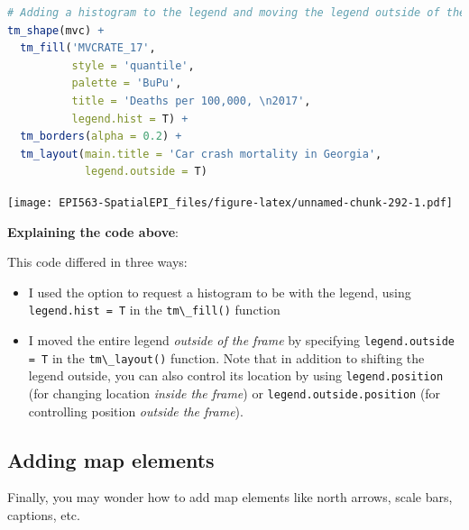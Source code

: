 \documentclass[
]{book}
\newcommand{\passthrough}[1]{#1}
\providecommand{\tightlist}{%
  \setlength{\itemsep}{0pt}\setlength{\parskip}{0pt}}
\begin{document}
\begin{lstlisting}[language=R]
# Adding a histogram to the legend and moving the legend outside of the frame
tm_shape(mvc) +
  tm_fill('MVCRATE_17',
          style = 'quantile',
          palette = 'BuPu',
          title = 'Deaths per 100,000, \n2017',
          legend.hist = T) +
  tm_borders(alpha = 0.2) +
  tm_layout(main.title = 'Car crash mortality in Georgia',
            legend.outside = T)
\end{lstlisting}

\texttt{[image: EPI563-SpatialEPI\_files/figure-latex/unnamed-chunk-292-1.pdf]}

\textbf{Explaining the code above}:

This code differed in three ways:

\begin{itemize}
\tightlist
\item
  I used the option to request a histogram to be with the legend, using \passthrough{\lstinline!legend.hist = T!} in the \passthrough{\lstinline!tm\_fill()!} function
\item
  I moved the entire legend \emph{outside of the frame} by specifying \passthrough{\lstinline!legend.outside = T!} in the \passthrough{\lstinline!tm\_layout()!} function. Note that in addition to shifting the legend outside, you can also control its location by using \passthrough{\lstinline!legend.position!} (for changing location \emph{inside the frame}) or \passthrough{\lstinline!legend.outside.position!} (for controlling position \emph{outside the frame}).
\end{itemize}

\hypertarget{adding-map-elements}{%
\subsection{Adding map elements}\label{adding-map-elements}}

Finally, you may wonder how to add map elements like north arrows, scale bars, captions, etc.
\end{document}
